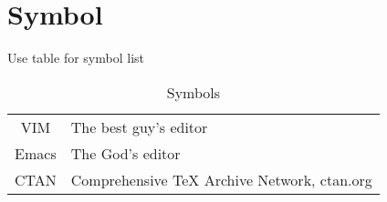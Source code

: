 \documentclass[class=NCU_thesis_en, crop=false]{standalone}
\begin{document}
\chapter{Symbol}
Use table for symbol list

\begin{table}[h]
	\fontsize{14}{25}\selectfont  %
	\centering
	\begin{tabular}{c@{\quad}@{：}l}
		VIM     & The best guy's editor \\ 
		Emacs   & The God's editor \\ 
		CTAN    & Comprehensive TeX Archive Network, ctan.org \\
		
	\end{tabular} 
	\caption{Symbols} %
	\label{table:symbol_def}
\end{table}
\end{document}
